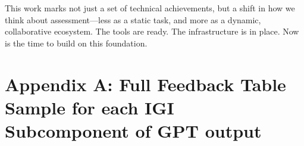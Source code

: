 \documentclass[12pt]{article}%
\begin{document}
This work marks not just a set of technical achievements, but a shift in how we think about assessment—less as a static task, and more as a dynamic, collaborative ecosystem. The tools are ready. The infrastructure is in place. Now is the time to build on this foundation.


\clearpage
\onecolumn
\appendix
\section*{Appendix A: Full Feedback Table Sample for each IGI Subcomponent of GPT output}



\twocolumn

\end{document}
